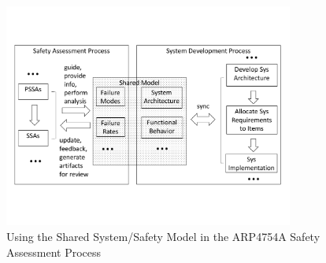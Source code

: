 \begin{figure}[t!]
	\vspace{-0.19in}
	\centering
	\includegraphics[trim=0 9 0 5,clip,width=0.85\textwidth]{images/safety_process.pdf}
	\caption{Using the Shared System/Safety Model in the ARP4754A Safety Assessment Process}
	\label{fig:proposed_safety_process}
\end{figure}

